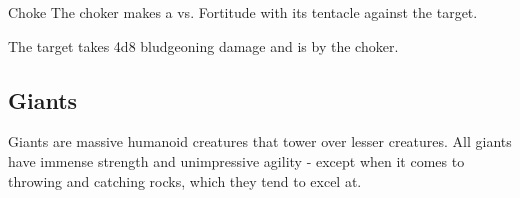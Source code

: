     \begin{freeability}{Choke}
       The choker makes a 
         vs. Fortitude
        with its tentacle against the target.
    
    \hit The target takes 4d8 bludgeoning damage and is  by the choker.
    \end{freeability}
  
    \subsection{Giants}
      
    Giants are massive humanoid creatures that tower over lesser creatures.
    All giants have immense strength and unimpressive agility - except when it comes to throwing and catching rocks, which they tend to excel at.
  

      

